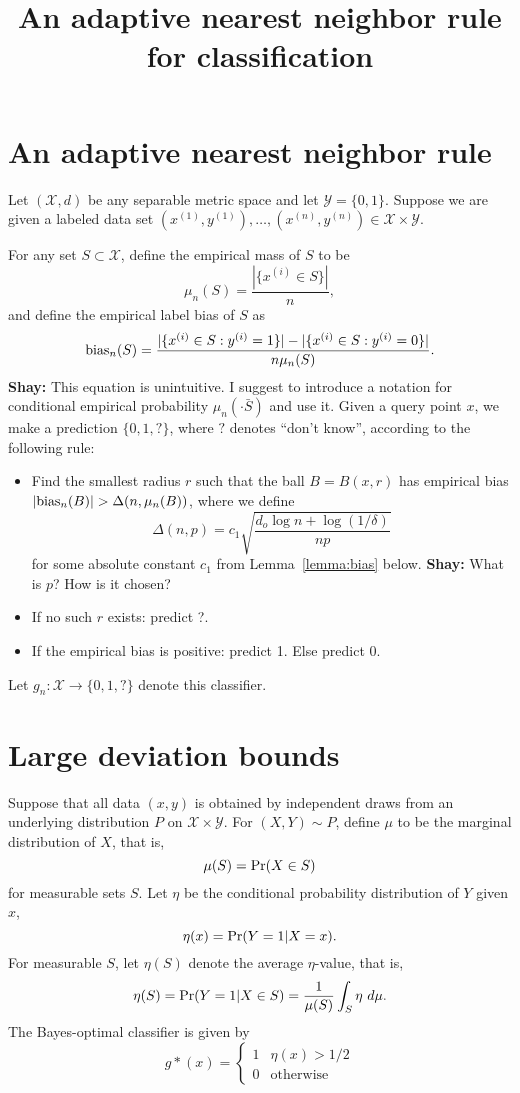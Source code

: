 \documentclass{article}
\title{An adaptive nearest neighbor rule for classification}
\def\pr{{\rm Pr}}
\def\X{{\mathcal X}}
\def\Y{{\mathcal Y}}
\def\bias{{\rm bias}}
\newcommand{\shay}[1]{{\color{purple} {\bf Shay:} #1}}
\begin{document}
\maketitle

\section{An adaptive nearest neighbor rule}

Let $(\X,d)$ be any separable metric space and let $\Y = \{0,1\}$. Suppose we are given a labeled data set $(x^{(1)}, y^{(1)}), \ldots, (x^{(n)}, y^{(n)}) \in \X \times \Y$.

For any set $S \subset \X$, define the empirical mass of $S$ to be
\begin{equation}
  \mu_n(S) = \frac{|\{x^{(i)} \in S\}|}{n} ,
\label{eq:empirical-mass}
\end{equation}
and define the empirical label bias of $S$ as
\begin{equation}
  \bias_n(S) = \frac{|\{x^{(i)} \in S: y^{(i)} = 1\}| - |\{x^{(i)} \in S: y^{(i)} = 0\}|}{n \mu_n(S)}.
\label{eq:empirical-bias}
\end{equation}
\shay{This equation is unintuitive. I suggest to introduce a notation for conditional empirical probability $\mu_n(\cdot \bar S)$
and use it.}
Given a query point $x$, we make a prediction $\{0,1,?\}$, where $?$ denotes ``don't know'', according to the following rule:
\begin{itemize}
\item Find the smallest radius $r$ such that the ball $B = B(x,r)$ has empirical bias $|\bias_n(B)| > \Delta(n, \mu_n(B))$, where we define
$$ \Delta(n,p) = c_1 \sqrt{\frac{d_o \log n + \log (1/\delta)}{np}} $$
for some absolute constant $c_1$ from Lemma~\ref{lemma:bias} below.
\shay{What is $p$? How is it chosen?}
\item If no such $r$ exists: predict ?.
\item If the empirical bias is positive: predict 1. Else predict 0.
\end{itemize}
Let $g_n: \X \rightarrow \{0,1,?\}$ denote this classifier.

\section{Large deviation bounds}

Suppose that all data $(x,y)$ is obtained by independent draws from an underlying distribution $P$ on $\X \times \Y$. For $(X,Y) \sim P$, define $\mu$ to be the marginal distribution of $X$, that is,
$$ \mu(S) = \pr(X \in S) $$
for measurable sets $S$. Let $\eta$ be the conditional probability distribution of $Y$ given $x$,
$$ \eta(x) = \pr(Y = 1| X = x) .$$
For measurable $S$, let $\eta(S)$ denote the average $\eta$-value, that is,
$$ \eta(S) = \pr(Y = 1| X \in S) = \frac{1}{\mu(S)} \int_S \eta \ d \mu .$$
The Bayes-optimal classifier is given by
$$ g*(x) = 
\left\{
\begin{array}{ll}
1 & \mbox{$\eta(x) > 1/2$} \\
0 & \mbox{otherwise}
\end{array}
\right.
$$
\end{document}
